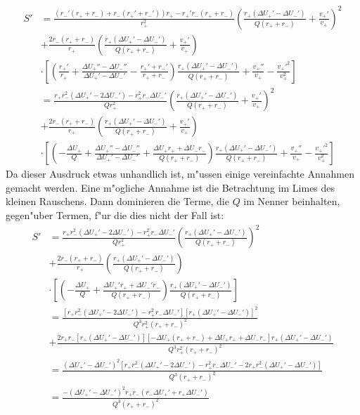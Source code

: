 \documentclass[12pt,a4paper]{article}
\begin{document}
\begin{align*}
S'&=\frac{(r_-'(r_++r_-)+r_-(r_+'+r_-'))r_+-r_+'r_-(r_++r_-)}{r_+^2}\left(\frac{r_+(\Delta U_+'-\Delta U_-')}{Q(r_++r_-)}+\frac{v_+'}{v_+}\right)^2\\
&+\frac{2r_-(r_++r_-)}{r_+}\left(\frac{r_+(\Delta U_+'-\Delta U_-')}{Q(r_++r_-)}+\frac{v_+'}{v_+}\right) \\&\cdot \left[\left(\frac{r_+'}{r_+}+\frac{\Delta U_+''-\Delta U_-''}{\Delta U_+'-\Delta U_-'}-\frac{r_+'+r_-'}{r_++r_-}\right)\frac{r_+(\Delta U_+'-\Delta U_-')}{Q(r_++r_-)}+\frac{v_+''}{v_+}-\frac{v_+'^2}{v_+^2}\right]\\
&=\frac{r_+r_-^2(\Delta U_+'-2\Delta U_-')-r_+^2r_-\Delta U_-'}{Qr_+^2}\left(\frac{r_+(\Delta U_+'-\Delta U_-')}{Q(r_++r_-)}+\frac{v_+'}{v_+}\right)^2\\
&+\frac{2r_-(r_++r_-)}{r_+}\left(\frac{r_+(\Delta U_+'-\Delta U_-')}{Q(r_++r_-)}+\frac{v_+'}{v_+}\right) \\&\cdot \left[\left(-\frac{\Delta U_+}{Q}+\frac{\Delta U_+''-\Delta U_-''}{\Delta U_+'-\Delta U_-'}+\frac{\Delta U_+r_++\Delta U_-r_-}{Q(r_++r_-)}\right)\frac{r_+(\Delta U_+'-\Delta U_-')}{Q(r_++r_-)}+\frac{v_+''}{v_+}-\frac{v_+'^2}{v_+^2}\right]
\end{align*}
Da dieser Ausdruck etwas unhandlich ist, m"ussen einige vereinfachte Annahmen gemacht werden. Eine m"ogliche Annahme ist die Betrachtung im Limes des kleinen Rauschens. Dann dominieren die Terme, die $Q$ im Nenner beinhalten, gegen"uber Termen, f"ur die dies nicht der Fall ist:
\begin{align*}
S'&=\frac{r_+r_-^2(\Delta U_+'-2\Delta U_-')-r_+^2r_-\Delta U_-'}{Qr_+^2}\left(\frac{r_+(\Delta U_+'-\Delta U_-')}{Q(r_++r_-)}\right)^2\\
&+\frac{2r_-(r_++r_-)}{r_+}\left(\frac{r_+(\Delta U_+'-\Delta U_-')}{Q(r_++r_-)}\right) \\&\cdot \left[\left(-\frac{\Delta U_+}{Q}+\frac{\Delta U_+'r_++\Delta U_-'r_-}{Q(r_++r_-)}\right)\frac{r_+(\Delta U_+'-\Delta U_-')}{Q(r_++r_-)}\right]\\
&=\frac{[r_+r_-^2(\Delta U_+'-2\Delta U_-')-r_+^2r_-\Delta U_-'][r_+(\Delta U_+'-\Delta U_-')]^2}{Q^3r_+^2(r_++r_-)^2}\\
&+\frac{2r_+r_-[r_+(\Delta U_+'-\Delta U_-')][-\Delta U_+(r_++r_-)+\Delta U_+r_++\Delta U_-r_-]r_+(\Delta U_+'-\Delta U_-')}{Q^3r_+^2(r_++r_-)^2}\\
&=\frac{(\Delta U_+'-\Delta U_-')^2[r_+r_-^2(\Delta U_+'-2\Delta U_-')-r_+^2r_-\Delta U_-'-2r_+r_-^2(\Delta U_+'-\Delta U_-')]}{Q^3(r_++r_-)^2}\\
&=\frac{-(\Delta U_+'-\Delta U_-')^2r_+r_-(r_-\Delta U_+'+r_+\Delta U_-')}{Q^3(r_++r_-)^2}
\end{align*}
\end{document}
